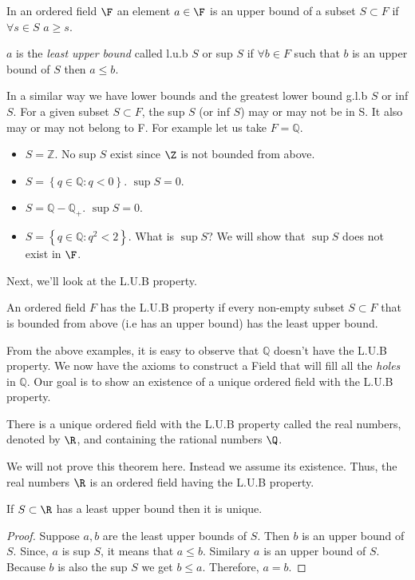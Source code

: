 \begin{Definition}
    In an ordered field $\F$ an element $a \in \F$ is an upper bound of a subset $S \subset F$ if
    $ \forall s \in S$ $ a \geq s$.
\end{Definition}
\begin{Definition}
    $a$ is the \textit{least upper bound} called l.u.b $S$ or sup $S$ if $\forall b \in F$ such that
    $b$ is an upper bound of $S$ then $ a \leq b$.  
\end{Definition}
In a similar way we have lower bounds and the greatest lower bound g.l.b $S$ or inf $S$. 
For a given subset $S \subset F$, the sup $S$ (or inf $S$) may or may not be in S. It 
also may or may not belong to F. For example let us take $ F = \mathbb{Q} $. 
\begin{itemize}
    \item $ S = \mathbb{Z} $. No sup $S$ exist since $\Z$ is not bounded from above.
    \item $ S = \left \lbrace q \in \mathbb{Q} : q < 0 \right \rbrace$. $\sup{S} = 0$.
    \item $ S = \mathbb{Q} - \mathbb{Q}_+ $. $\sup{S}  = 0$.
    \item $ S = \left \lbrace q \in \mathbb{Q} : q^2 < 2 \right \rbrace $. What is $\sup{S}$? We will 
	show that $\sup{S}$ does not exist in $\F$. 
\end{itemize}
Next, we'll look at the L.U.B property. 
\begin{Definition}
    An ordered field $F$ has the L.U.B property if every non-empty subset $ S \subset F$ that is bounded
    from above (i.e has an upper bound) has the least upper bound.  
\end{Definition}

From the above examples, it is easy to observe that $\mathbb{Q}$ doesn't have the L.U.B property.
We now have the axioms to construct a Field that will fill all the \textit{holes} in $\mathbb{Q}$.
Our goal is to show an existence of a unique ordered field with the L.U.B property. 
\begin{Theorem}[name=Existence of $\mathbb{R}$]
    There is a unique ordered field with the L.U.B property called the real numbers, denoted by $\R$, and
    containing the rational numbers $\Q$.
\end{Theorem} 
We will not prove this theorem here. Instead we assume its existence. Thus, the real numbers $\R$ is an
ordered field having the L.U.B property.

\begin{Corollary}
    If $S \subset \R$ has a least upper bound then it is unique. 
\end{Corollary}
\begin{proof}
    Suppose $a,b$ are the least upper bounds of $S$. Then $b$ is an upper bound of $S$.
    Since, $a$ is sup $S$, it means that $ a \leq b$. Similary $a$ is an upper bound of $S$.
    Because $b$ is also the sup $S$ we get $ b \leq a $. Therefore, $a = b$.
\end{proof}

